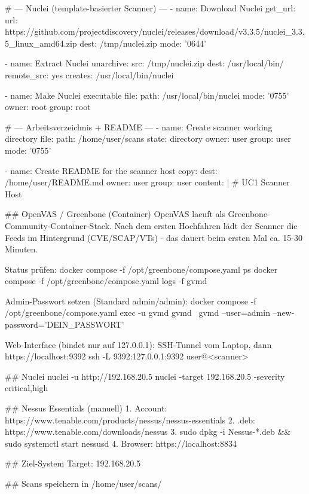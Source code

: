 \begin{GenericCode}
# --- Nuclei (template-basierter Scanner) ---
- name: Download Nuclei
  get_url:
    url: https://github.com/projectdiscovery/nuclei/releases/download/v3.3.5/nuclei_3.3.5_linux_amd64.zip
    dest: /tmp/nuclei.zip
    mode: '0644'

- name: Extract Nuclei
  unarchive:
    src: /tmp/nuclei.zip
    dest: /usr/local/bin/
    remote_src: yes
    creates: /usr/local/bin/nuclei

- name: Make Nuclei executable
  file:
    path: /usr/local/bin/nuclei
    mode: '0755'
    owner: root
    group: root

# --- Arbeitsverzeichnis + README ---
- name: Create scanner working directory
  file:
    path: /home/user/scans
    state: directory
    owner: user
    group: user
    mode: '0755'

- name: Create README for the scanner host
  copy:
    dest: /home/user/README.md
    owner: user
    group: user
    content: |
      # UC1 Scanner Host

      ## OpenVAS / Greenbone (Container)
      OpenVAS laeuft als Greenbone-Community-Container-Stack.
      Nach dem ersten Hochfahren lädt der Scanner die Feeds im Hintergrund
      (CVE/SCAP/VTs) - das dauert beim ersten Mal ca. 15-30 Minuten.

      Status prüfen:
        docker compose -f /opt/greenbone/compose.yaml ps
        docker compose -f /opt/greenbone/compose.yaml logs -f gvmd

      Admin-Passwort setzen (Standard admin/admin):
        docker compose -f /opt/greenbone/compose.yaml exec -u gvmd gvmd \
          gvmd --user=admin --new-password='DEIN_PASSWORT'

      Web-Interface (bindet nur auf 127.0.0.1):
        SSH-Tunnel vom Laptop, dann https://localhost:9392
          ssh -L 9392:127.0.0.1:9392 user@<scanner>

      ## Nuclei
        nuclei -u http://192.168.20.5
        nuclei -target 192.168.20.5 -severity critical,high

      ## Nessus Essentials (manuell)
      1. Account: https://www.tenable.com/products/nessus/nessus-essentials
      2. .deb: https://www.tenable.com/downloads/nessus
      3. sudo dpkg -i Nessus-*.deb && sudo systemctl start nessusd
      4. Browser: https://localhost:8834

      ## Ziel-System
      Target: 192.168.20.5

      ## Scans speichern in
      /home/user/scans/
\end{GenericCode}
